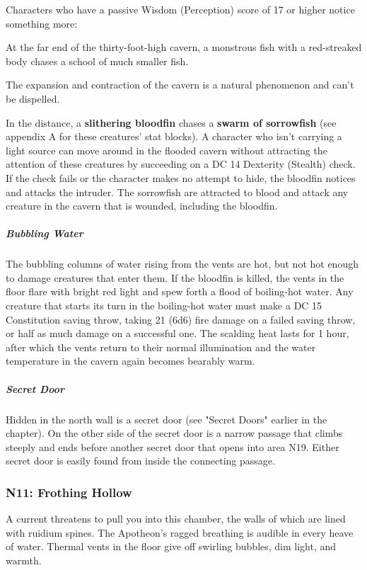 \documentclass[10pt,a4paper,twoside,bg=print,twocolumn,openany,nodeprecatedcode]{dndbook}
\begin{document}
Characters who have a passive Wisdom (Perception) score of 17 or higher notice something more:

\begin{DndReadAloud}{}
At the far end of the thirty-foot-high cavern, a monstrous fish with a red-streaked body chases a school of much smaller fish.

\end{DndReadAloud}

The expansion and contraction of the cavern is a natural phenomenon and can't be dispelled.

In the distance, a \textbf{slithering bloodfin} chases a \textbf{swarm of sorrowfish} (see appendix A for these creatures' stat blocks). A character who isn't carrying a light source can move around in the flooded cavern without attracting the attention of these creatures by succeeding on a DC 14 Dexterity (Stealth) check. If the check fails or the character makes no attempt to hide, the bloodfin notices and attacks the intruder. The sorrowfish are attracted to blood and attack any creature in the cavern that is wounded, including the bloodfin.

\subparagraph{Bubbling Water}
The bubbling columns of water rising from the vents are hot, but not hot enough to damage creatures that enter them. If the bloodfin is killed, the vents in the floor flare with bright red light and spew forth a flood of boiling-hot water. Any creature that starts its turn in the boiling-hot water must make a DC 15 Constitution saving throw, taking 21 (6d6) fire damage on a failed saving throw, or half as much damage on a successful one. The scalding heat lasts for 1 hour, after which the vents return to their normal illumination and the water temperature in the cavern again becomes bearably warm.

\subparagraph{Secret Door}
Hidden in the north wall is a secret door (see "Secret Doors" earlier in the chapter). On the other side of the secret door is a narrow passage that climbs steeply and ends before another secret door that opens into area N19. Either secret door is easily found from inside the connecting passage.

\subsubsection{N11: Frothing Hollow}
\begin{DndReadAloud}{}
A current threatens to pull you into this chamber, the walls of which are lined with ruidium spines. The Apotheon's ragged breathing is audible in every heave of water. Thermal vents in the floor give off swirling bubbles, dim light, and warmth.

\end{DndReadAloud}
\end{document}
